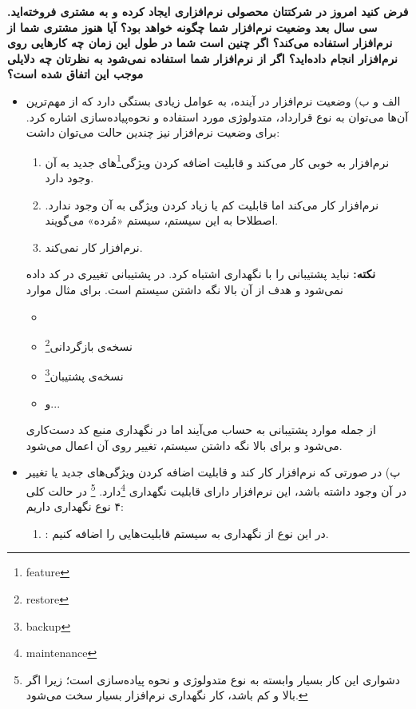 
	
	\textbf{فرض کنید امروز در شرکتتان محصولی نرم‌افزاری ایجاد کرده و به مشتری فروخته‌اید. سی سال بعد وضعیت نرم‌افزار شما چگونه خواهد بود؟ آیا هنوز مشتری شما از نرم‌افزار استفاده می‌کند؟ اگر چنین است شما در طول این زمان چه کارهایی روی نرم‌افزار انجام داده‌اید؟ اگر از نرم‌افزار شما استفاده نمی‌شود به نظرتان چه دلایلی موجب این اتفاق شده است؟}
	
	\begin{itemize}
		\item 
		الف و ب) وضعیت نرم‌افزار در آینده، به عوامل زیادی بستگی  دارد که از مهم‌ترین آن‌ها می‌توان به نوع قرارداد، متدولوژی مورد استفاده و نحوه‌پیاده‌سازی اشاره کرد. برای وضعیت نرم‌افزار نیز چندین حالت می‌توان داشت:
		
		\begin{enumerate}
			\item نرم‌افزار به خوبی کار می‌کند و قابلیت اضافه کردن ویژگی‌\footnote{feature}های جدید به آن وجود دارد.
			\item 
			نرم‌افزار کار می‌کند اما قابلیت کم یا زیاد کردن ویژگی به آن وجود ندارد. اصطلاحا به این سیستم، سیستم «مُرده» می‌گویند. 
			\item 
			نرم‌افزار کار نمی‌کند.
		\end{enumerate}
		\textbf{نکته:} نباید پشتیبانی را با نگهداری اشتباه کرد. در پشتیبانی تغییری در کد داده نمی‌شود و هدف از آن بالا نگه داشتن سیستم است. برای مثال موارد 
		\begin{itemize}
			\item {}
			\item نسخه‌ی بازگردانی\footnote{restore}
			\item نسخه‌ی پشتیبان\footnote{backup}
			\item و...
		\end{itemize}
		از جمله موارد پشتیبانی به حساب می‌آیند اما در نگهداری منبع کد دست‌کاری می‌شود و برای بالا نگه داشتن سیستم، تغییر روی آن اعمال می‌شود.
	\item 
	پ) در صورتی که نرم‌افزار کار کند و قابلیت اضافه کردن ویژگی‌های جدید یا تغییر در آن وجود داشته باشد، این نرم‌افزار دارای قابلیت نگهداری \footnote{maintenance}دارد. \footnote{دشواری این کار بسیار وابسته به نوع متدولوژی و نحوه پیاده‌سازی است؛ زیرا اگر  بالا و  کم باشد، کار نگهداری نرم‌افزار  بسیار سخت می‌شود.} در حالت کلی ۴ نوع نگهداری داریم:
		\begin{enumerate}
			\item {}: در این نوع از نگهداری به سیستم قابلیت‌هایی را اضافه کنیم.

\end{enumerate}
\end{itemize}
